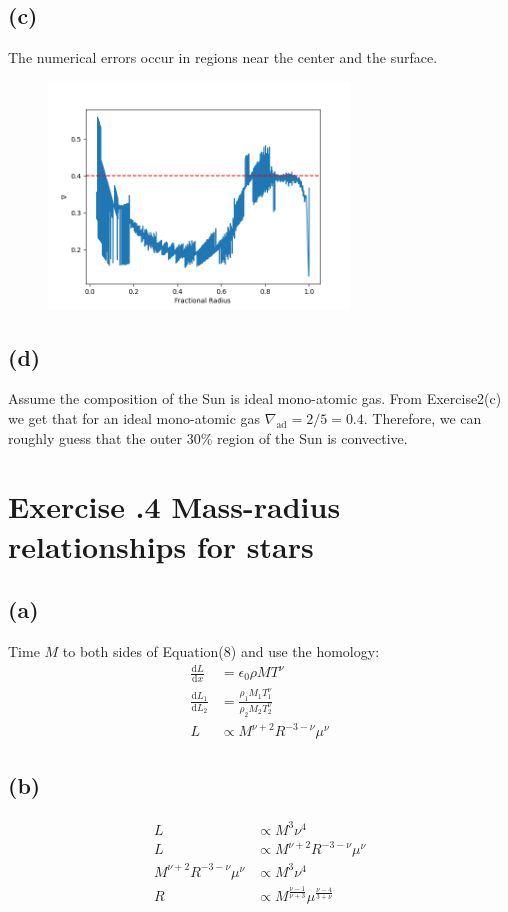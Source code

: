 \documentclass[a4paper,12pt]{article}
\renewcommand{\d}{\mathrm{d}}
\begin{document}
\subsection*{(c)}
The numerical errors occur in regions near the center and the surface.
\begin{figure}[htbp]
    \centering
    \includegraphics*[width=8cm]{nabla.png}
\end{figure}

\subsection*{(d)}
Assume the composition of the Sun is ideal mono-atomic gas. 
From Exercise2(c) we get that for an ideal mono-atomic gas $\nabla_{\text{ad}} = 2/5=0.4$.
Therefore, we can roughly guess that the outer 30\% region of the Sun is convective.


\section*{\textbf{Exercise \uppercase\expandafter{}.4 Mass-radius relationships for stars}}
\subsection*{(a)}
Time $M$ to both sides of Equation(8) and use the homology:
\begin{align*}
    \frac{\d L}{\d x} &= \epsilon_0 \rho M T^\nu \\
    \frac{\d L_1}{\d L_2} &= \frac{\rho_1 M_1 T_1^\nu}{\rho_2 M_2 T_2^\nu} \\
    L & \propto M^{\nu+2} R^{-3-\nu} \mu^{\nu}
\end{align*}

\subsection*{(b)}
\begin{align*}
    L &\propto M^3 \nu^4 \\
    L & \propto M^{\nu+2} R^{-3-\nu} \mu^{\nu} \\
    M^{\nu+2} R^{-3-\nu} \mu^{\nu} &\propto M^3 \nu^4 \\
    R &\propto M^{\frac{\nu -1}{\nu +3}} \mu^{\frac{\nu -4}{3+\nu }}
\end{align*}
\end{document}

